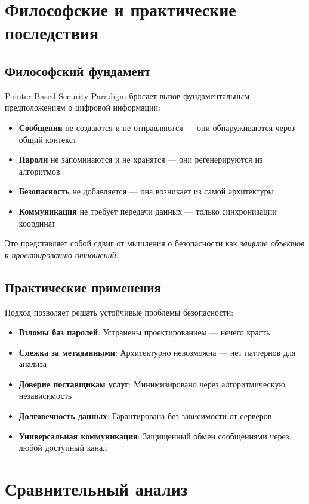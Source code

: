\documentclass[11pt,a4paper]{article}
\begin{document}
\section{Философские и практические последствия}

\subsection{Философский фундамент}

Pointer-Based Security Paradigm бросает вызов фундаментальным предположениям о цифровой информации:

\begin{itemize}
    \item \textbf{Сообщения} не создаются и не отправляются — они обнаруживаются через общий контекст
    \item \textbf{Пароли} не запоминаются и не хранятся — они регенерируются из алгоритмов
    \item \textbf{Безопасность} не добавляется — она возникает из самой архитектуры
    \item \textbf{Коммуникация} не требует передачи данных — только синхронизации координат
\end{itemize}

Это представляет собой сдвиг от мышления о безопасности как \emph{защите объектов} к \emph{проектированию отношений}.

\subsection{Практические применения}

Подход позволяет решать устойчивые проблемы безопасности:

\begin{itemize}
\item \textbf{Взломы баз паролей}: Устранены проектированием — нечего красть
\item \textbf{Слежка за метаданными}: Архитектурно невозможна — нет паттернов для анализа
\item \textbf{Доверие поставщикам услуг}: Минимизировано через алгоритмическую независимость
\item \textbf{Долговечность данных}: Гарантирована без зависимости от серверов
\item \textbf{Универсальная коммуникация}: Защищенный обмен сообщениями через любой доступный канал
\end{itemize}

\section{Сравнительный анализ}
\end{document}
